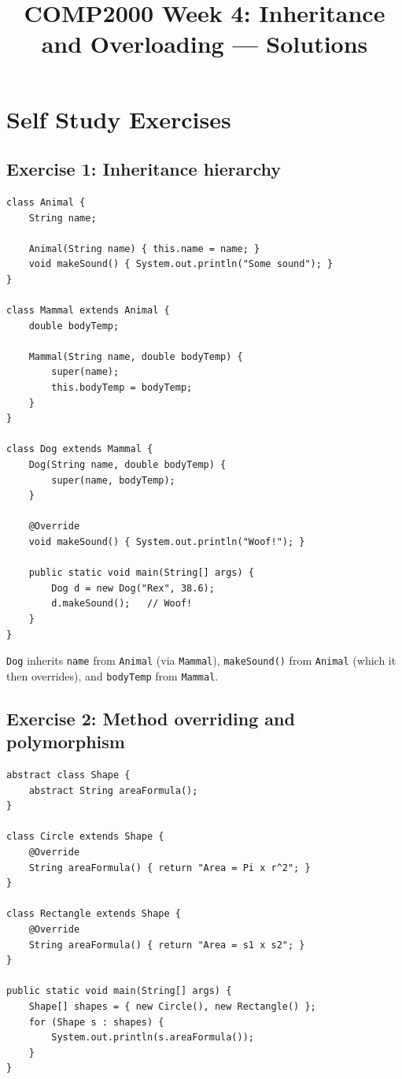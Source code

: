 \documentclass[twoside=false,DIV=14]{scrartcl}
\title{\color{redish} \vspace{-1em}COMP2000 Week 4: Inheritance and Overloading --- Solutions}
\begin{document}
{\color{blackish}\maketitle}\vspace{-7em}

\section*{Self Study Exercises}

\subsection*{Exercise 1: Inheritance hierarchy}

\begin{lstlisting}
class Animal {
    String name;

    Animal(String name) { this.name = name; }
    void makeSound() { System.out.println("Some sound"); }
}

class Mammal extends Animal {
    double bodyTemp;

    Mammal(String name, double bodyTemp) {
        super(name);
        this.bodyTemp = bodyTemp;
    }
}

class Dog extends Mammal {
    Dog(String name, double bodyTemp) {
        super(name, bodyTemp);
    }

    @Override
    void makeSound() { System.out.println("Woof!"); }

    public static void main(String[] args) {
        Dog d = new Dog("Rex", 38.6);
        d.makeSound();   // Woof!
    }
}
\end{lstlisting}

\texttt{Dog} inherits \texttt{name} from \texttt{Animal} (via \texttt{Mammal}), \texttt{makeSound()} from \texttt{Animal} (which it then overrides), and \texttt{bodyTemp} from \texttt{Mammal}.

\subsection*{Exercise 2: Method overriding and polymorphism}

\begin{lstlisting}
abstract class Shape {
    abstract String areaFormula();
}

class Circle extends Shape {
    @Override
    String areaFormula() { return "Area = Pi x r^2"; }
}

class Rectangle extends Shape {
    @Override
    String areaFormula() { return "Area = s1 x s2"; }
}

public static void main(String[] args) {
    Shape[] shapes = { new Circle(), new Rectangle() };
    for (Shape s : shapes) {
        System.out.println(s.areaFormula());
    }
}
\end{lstlisting}
\end{document}
